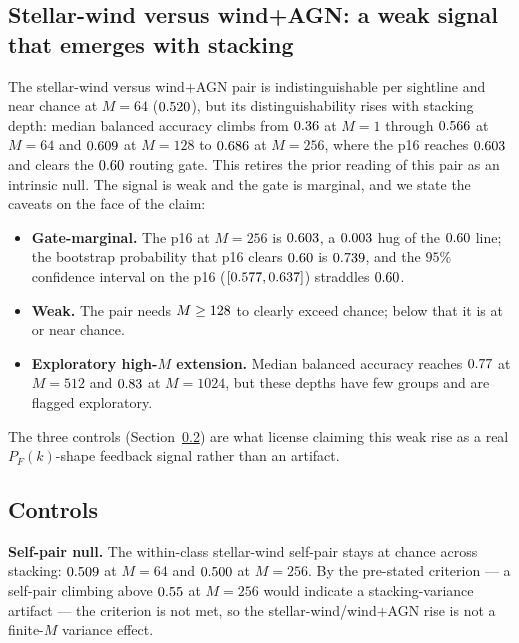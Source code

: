 \subsection{Stellar-wind versus wind+AGN: a weak signal that emerges with stacking}
\label{sec:results:weak}

The stellar-wind versus wind${+}$AGN pair is indistinguishable per sightline and
near chance at $M=64$ ($0.520$), but its distinguishability rises with stacking
depth: median balanced accuracy climbs from $0.36$ at $M=1$ through
$0.566$ at $M=64$ and $0.609$ at $M=128$ to $0.686$ at
$M=256$, where the p16 reaches $0.603$ and clears the
$0.60$ routing gate. This retires the prior reading of this pair as an
intrinsic null. The signal is weak and the gate is marginal, and we state the
caveats on the face of the claim:
\begin{itemize}
  \item \textbf{Gate-marginal.} The p16 at $M=256$ is $0.603$,
        a $0.003$ hug of the $0.60$ line; the bootstrap probability
        that p16 clears $0.60$ is $0.739$, and the $95\%$ confidence
        interval on the p16 ($[0.577,0.637]$) straddles $0.60$.
  \item \textbf{Weak.} The pair needs $M\geq128$ to clearly exceed chance;
        below that it is at or near chance.
  \item \textbf{Exploratory high-$M$ extension.} Median balanced accuracy reaches
        $0.77$ at $M=512$ and $0.83$ at $M=1024$,
        but these depths have few groups and are flagged exploratory.
\end{itemize}

The three controls (Section~\ref{sec:results:controls}) are what license claiming
this weak rise as a real $P_F(k)$-shape feedback signal rather than an artifact.

\subsection{Controls}
\label{sec:results:controls}

\textbf{Self-pair null.} The within-class stellar-wind self-pair stays at chance
across stacking: $0.509$ at $M=64$ and $0.500$ at
$M=256$. By the pre-stated criterion --- a self-pair climbing above
$0.55$ at $M=256$ would indicate a stacking-variance artifact --- the
criterion is not met, so the stellar-wind/wind${+}$AGN rise is not a finite-$M$
variance effect.

